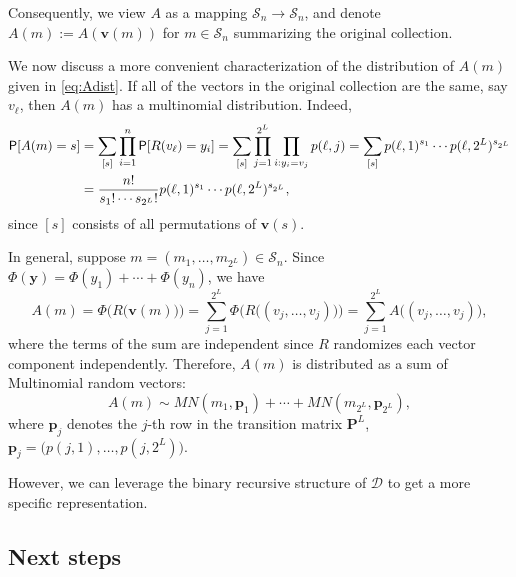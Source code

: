 \documentclass[11pt,draft]{article}
\newcommand{\Dsp}{\mathcal{D}}
\newcommand{\Ssp}{\mathcal{S}}
\newcommand{\yv}{\mathbf{y}}
\newcommand{\vv}{\mathbf{v}}
\newcommand{\pv}{\mathbf{p}}
\newcommand{\Pm}{\mathbf{P}}
\begin{document}
Consequently, we view $A$ as a mapping $\Ssp_n \rightarrow \Ssp_n$, and denote
$A(m) := A(\vv(m))$ for $m\in\Ssp_n$ summarizing the original collection.


We now discuss a more convenient characterization of the distribution of $A(m)$
given in \eqref{eq:Adist}.
If all of the vectors in the original collection are the same, say $v_\ell$,
then $A(m)$ has a multinomial distribution.
Indeed,
\begin{align*}
\P[A(m) = s] &= \sum_{[s]} \prod_{i=1}^n \P[R(v_\ell) = y_i] =
\sum_{[s]} \prod_{j = 1}^{2^L}\prod_{i: y_i = v_j} p(\ell, j) =
\sum_{[s]} p(\ell, 1)^{s_1}\cdots p(\ell, 2^L)^{s_{2^L}} \\
&= \frac{n!}{s_1!\cdots s_{2^L}!} p(\ell, 1)^{s_1}\cdots p(\ell, 2^L)^{s_{2^L}},
\end{align*}
since $[s]$ consists of all permutations of $\vv(s)$.

In general, suppose $m = (m_1,\dots,m_{2^L})\in\Ssp_n$.
Since $\Phi(\yv) = \Phi(y_1) + \cdots + \Phi(y_n)$, we have
\[ A(m) = \Phi\big(R\big(\vv(m)\big)\big) =
\sum_{j=1}^{2^L} \Phi\big(R\big((v_j,\dots,v_j)\big)\big) =
\sum_{j=1}^{2^L} A\big((v_j,\dots,v_j)\big), \]
where the terms of the sum are independent since $R$ randomizes each vector
component independently.
Therefore, $A(m)$ is distributed as a sum of Multinomial random vectors:
\[ A(m) \sim MN(m_1, \pv_1) + \cdots + MN(m_{2^L}, \pv_{2^L}), \]
where $\pv_j$ denotes the $j$-th row in the transition matrix
$\Pm^L$, \ie $\pv_j = \big(p(j,1),\dots,p(j,2^L)\big)$.

However, we can leverage the binary recursive structure of $\Dsp$ to get a
more specific representation.


\hrulefill

\subsection{Next steps}
\end{document}
